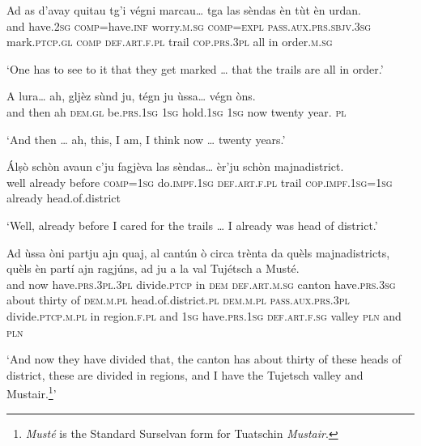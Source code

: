 \begin{linenumbers}
\gll  Ad as d’avay quitau tg’i végni marcau… tga las sèndas èn tùt èn urdan.  \\
and have.\textsc{2sg} \textsc{comp=}have.\textsc{inf} worry.\textsc{m.sg} \textsc{comp=expl} \textsc{pass.aux.prs.sbjv.3sg} mark.\textsc{ptcp.gl} \textsc{comp} \textsc{def.art.f.pl} trail \textsc{cop.prs.3pl} all in order.\textsc{m.sg}  \\
\end{linenumbers}
\medskip
\glt `One has to see to it that they get marked … that the trails are all in order.'
\medskip

\begin{linenumbers}
\gll  A lura… ah, gljèz sùnd ju, tégn ju ùssa… végn òns.  \\
and then ah \textsc{dem.gl} be.\textsc{prs.1sg} \textsc{1sg} hold.\textsc{1sg}  \textsc{1sg} now twenty year. \textsc{pl} \\
\end{linenumbers} 
\medskip
\glt `And then … ah, this, I am, I think now … twenty years.'
\medskip


\begin{linenumbers}
\gll  Álṣò schòn avaun c’ju fagjèva las sèndas… èr’ju schòn majnadistrict.  \\
well already before \textsc{comp=1sg} do.\textsc{impf.1sg} \textsc{def.art.f.pl} trail \textsc{cop.impf.1sg=1sg} already head.of.district  \\
\end{linenumbers}
\medskip
\glt `Well, already before I cared for the trails … I already was head of district.'
\medskip

\begin{linenumbers}
\gll Ad ùssa òni partju ajn quaj, al cantún ò circa trènta da quèls majnadistricts, quèls èn partí ajn ragjúns, ad ju a  la val Tujétsch a Musté.   \\
and now have.\textsc{prs.3pl.3pl} divide.\textsc{ptcp} in \textsc{dem} \textsc{def.art.m.sg} canton  have.\textsc{prs.3sg} about thirty of \textsc{dem.m.pl} head.of.district.\textsc{pl} \textsc{dem.m.pl} \textsc{pass.aux.prs.3pl} divide.\textsc{ptcp.m.pl} in region.\textsc{f.pl} and \textsc{1sg} have.\textsc{prs.1sg} \textsc{def.art.f.sg} valley \textsc{pln} and \textsc{pln}\\
\end{linenumbers}
\medskip
\glt `And now they have divided that, the canton has about thirty of these heads of district, these are divided in regions, and I have the Tujetsch valley and Mustair.\footnote{\textit{Musté} is the Standard Surselvan form for Tuatschin \textit{Mustair}.}'
\medskip

